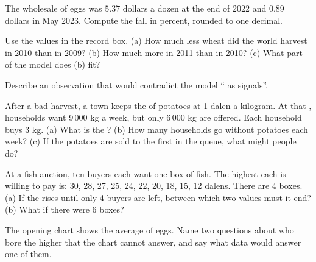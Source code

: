 \begin{exercise}[$\star\star$]\label{exo:g7:markets-and-prices:7}
The wholesale  of eggs was $5.37$ dollars a dozen at the end of 2022 and $0.89$ dollars
in May 2023. Compute the fall in percent, rounded to one decimal.
\end{exercise}

\begin{exercise}[$\star\star$]\label{exo:g7:markets-and-prices:8}
Use the values in the record box. (a) How much less wheat did the world harvest in 2010 than
in 2009? (b) How much more in 2011 than in 2010? (c) What part of the model does (b) fit?
\end{exercise}

\begin{exercise}[$\star\star$]\label{exo:g7:markets-and-prices:9}
Describe an observation that would contradict the model `` as signals''.
\end{exercise}

\begin{exercise}[$\star\star\star$]\label{exo:g7:markets-and-prices:10}
After a bad harvest, a town keeps the  of potatoes at 1 dalen a kilogram. At that
, households want 9\,000 kg a week, but only 6\,000 kg are offered. Each household
buys 3 kg. (a) What is the ? (b) How many households go without potatoes each week?
(c) If the potatoes are sold to the first in the queue, what might people do?
\end{exercise}

\begin{exercise}[$\star\star\star$]\label{exo:g7:markets-and-prices:11}
At a fish auction, ten buyers each want one box of fish. The highest  each is willing
to pay is: 30, 28, 27, 25, 24, 22, 20, 18, 15, 12 dalens. There are 4 boxes. (a) If the 
rises until only 4 buyers are left, between which two values must it end? (b) What if there
were 6 boxes?
\end{exercise}

\begin{exercise}[$\star\star\star$]\label{exo:g7:markets-and-prices:12}
The opening chart shows the average  of eggs. Name two questions about who bore the
higher  that the chart cannot answer, and say what data would answer one of them.
\end{exercise}

